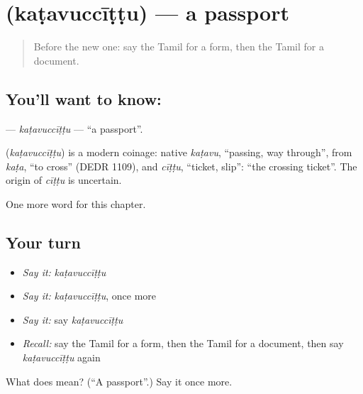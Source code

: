 \section[\texorpdfstring{\ta{கடவுச்சீட்டு} (kaṭavuccīṭṭu)}{கடவுச்சீட்டு (kaṭavuccīṭṭu)}]{ (kaṭavuccīṭṭu) — a passport}

\label{lesson:TA-C244-katavuccittu}



\begin{quote}
Before the new one: say the Tamil for a form, then the Tamil for a document.
\end{quote}

\subsection*{You'll want to know: }
\textbf{} — \emph{kaṭavuccīṭṭu} — \textquotedblleft{}a passport\textquotedblright{}.

\begin{cousinweb}
\textbf{} (\emph{kaṭavuccīṭṭu}) is a modern coinage: native \emph{kaṭavu}, \textquotedblleft{}passing, way through\textquotedblright{}, from \emph{kaṭa}, \textquotedblleft{}to cross\textquotedblright{} (DEDR 1109), and \emph{cīṭṭu}, \textquotedblleft{}ticket, slip\textquotedblright{}: \textquotedblleft{}the crossing ticket\textquotedblright{}. The origin of \emph{cīṭṭu} is uncertain.
\end{cousinweb}

\begin{grammarlens}[title={What you've built}]
One more word for this chapter.
\end{grammarlens}

\subsection*{Your turn}
\begin{itemize}
\raggedright
  \item \emph{Say it:} \emph{kaṭavuccīṭṭu}
  \item \emph{Say it:} \emph{kaṭavuccīṭṭu}, once more
  \item \emph{Say it:} say \emph{kaṭavuccīṭṭu}
  \item \emph{Recall:} say the Tamil for a form, then the Tamil for a document, then say \emph{kaṭavuccīṭṭu} again
\end{itemize}

\begin{tcolorbox}[breakable,colback=teal!4,colframe=teal!35!black,title={Before you move on}]
What does  mean? (\textquotedblleft{}A passport\textquotedblright{}.) Say it once more.
\end{tcolorbox}
